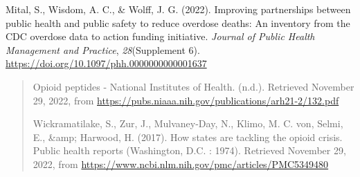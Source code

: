 \documentclass{article}
\begin{document}
Mital, S., Wisdom, A. C., \& Wolff, J. G. (2022). Improving partnerships
between public health and public safety to reduce overdose deaths: An
inventory from the CDC overdose data to action funding initiative.
\emph{Journal of Public Health Management and Practice},
\emph{28}(Supplement 6).
\href{https://doi.org/10.1097/phh.0000000000001637}{{https://doi.org/10.1097/phh.0000000000001637}}

\begin{quote}
Opioid peptides - National Institutes of Health. (n.d.). Retrieved
November 29, 2022, from
\href{https://pubs.niaaa.nih.gov/publications/arh21-2/132.pdf}{{https://pubs.niaaa.nih.gov/publications/arh21-2/132.pdf}}

Wickramatilake, S., Zur, J., Mulvaney-Day, N., Klimo, M. C. von, Selmi,
E., \&amp; Harwood, H. (2017). How states are tackling the opioid
crisis. Public health reports (Washington, D.C. : 1974). Retrieved
November 29, 2022, from
\href{https://www.ncbi.nlm.nih.gov/pmc/articles/PMC5349480/}{{https://www.ncbi.nlm.nih.gov/pmc/articles/PMC5349480}}
\end{quote}
\end{document}
